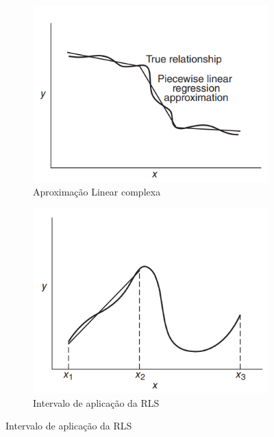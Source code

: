 \begin{figure}[H]
	\centering
	\caption{Situações de inadequação da RLS}
	\begin{subfigure}{0.4\textwidth}
	  \includegraphics[width=\linewidth]{figuras/piecewise_linear_approximation.png}
	  \caption{Aproximação Linear complexa}
	  \label{fig:aproximacao_linear_complexa}
	\end{subfigure}
	\hspace{0.5cm}
	\begin{subfigure}{0.4\textwidth} 
		\includegraphics[width=\linewidth]{figuras/danger_extrapolation_regression.png}
		\caption{Intervalo de aplicação da RLS}
		\label{fig:intervalo_aplicacao_rls}
	\end{subfigure}
	\label{fig:comportamento_regressao_linear}
\end{figure}

